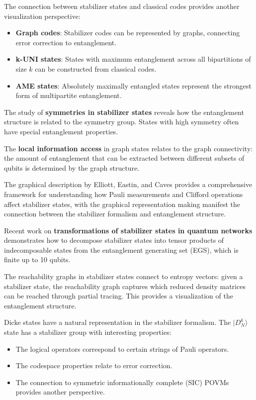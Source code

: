 \documentclass[%
 amsmath,amssymb,
 aps,
rmp,
]{revtex4-2}
\begin{document}
The connection between stabilizer states and classical codes provides another visualization perspective:
\begin{itemize}
	\item \textbf{Graph codes}: Stabilizer codes can be represented by graphs, connecting error correction to entanglement.
	\item \textbf{k-UNI states}: States with maximum entanglement across all bipartitions of size $k$ can be constructed from classical codes.
	\item \textbf{AME states}: Absolutely maximally entangled states represent the strongest form of multipartite entanglement.
\end{itemize}

The study of \textbf{symmetries in stabilizer states} \cite{Englbrecht2020} reveals how the entanglement structure is related to the symmetry group. States with high symmetry often have special entanglement properties.

The \textbf{local information access} in graph states relates to the graph connectivity: the amount of entanglement that can be extracted between different subsets of qubits is determined by the graph structure.

The graphical description by Elliott, Eastin, and Caves provides a comprehensive framework for understanding how Pauli measurements and Clifford operations affect stabilizer states, with the graphical representation making manifest the connection between the stabilizer formalism and entanglement structure.

Recent work on \textbf{transformations of stabilizer states in quantum networks} demonstrates how to decompose stabilizer states into tensor products of indecomposable states from the entanglement generating set (EGS), which is finite up to 10 qubits.

The reachability graphs in stabilizer states connect to entropy vectors: given a stabilizer state, the reachability graph captures which reduced density matrices can be reached through partial tracing. This provides a visualization of the entanglement structure.

Dicke states have a natural representation in the stabilizer formalism. The $|D_N^k\rangle$ state has a stabilizer group with interesting properties:
\begin{itemize}
	\item The logical operators correspond to certain strings of Pauli operators.
	\item The codespace properties relate to error correction.
	\item The connection to symmetric informationally complete (SIC) POVMs provides another perspective.
\end{itemize}
\end{document}
